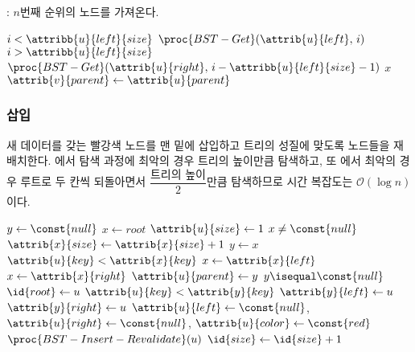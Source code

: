 : $n$번째 순위의 노드를 가져온다.

\begin{codebox}
\li \If $i < \attribb{u}{left}{size}$ \Then
\li     \Return $\proc{BST-Get}(\attrib{u}{left},\,i)$
\li \ElseIf $i > \attribb{u}{left}{size}$ \Then
\li     \Return $\proc{BST-Get}(\attrib{u}{right},\,i-\attribb{u}{left}{size}-1)$
\li \ElseNoIf
\li     \Return $x$
    \End
\li $\attrib{v}{parent} \gets \attrib{u}{parent}$
\end{codebox}

\newpage

\subsubsection{삽입} 새 데이터를 갖는 빨강색 노드를 맨 밑에 삽입하고 트리의 성질에 맞도록 노드들을 재배치한다.
에서 탐색 과정에 최악의 경우 트리의 높이만큼 탐색하고, 또 에서 최악의 경우
루트로 두 칸씩 되돌아면서 $\dfrac{\mbox{트리의 높이}}{2}$만큼 탐색하므로 시간 복잡도는 $\mathcal{O}\left(\log n\right)$이다.

\begin{codebox}
\li $y \gets \const{null}$
\li $x \gets root$
\li $\attrib{u}{size} \gets 1$
\li \While $x \neq \const{null}$ \Do
\li     $\attrib{x}{size} \gets \attrib{x}{size} + 1$
\li     $y \gets x$
\li     \If $\attrib{u}{key} < \attrib{x}{key}$ \Then
\li         $x \gets \attrib{x}{left}$
\li     \ElseNoIf
\li         $x \gets \attrib{x}{right}$
        \End
    \End
\li $\attrib{u}{parent} \gets y$
\li \If $y \isequal \const{null}$ \Then
\li     $\id{root} \gets u$
\li \ElseIf $\attrib{u}{key} < \attrib{y}{key}$ \Then
\li     $\attrib{y}{left} \gets u$
\li \ElseNoIf
\li     $\attrib{y}{right} \gets u$
    \End
\li $\attrib{u}{left} \gets \const{null}$, $\attrib{u}{right} \gets \const{null}$, $\attrib{u}{color} \gets \const{red}$ 
\li $\proc{BST-Insert-Revalidate}(u)$
\li $\id{size} \gets \id{size} + 1$
\end{codebox}

\newpage
    
